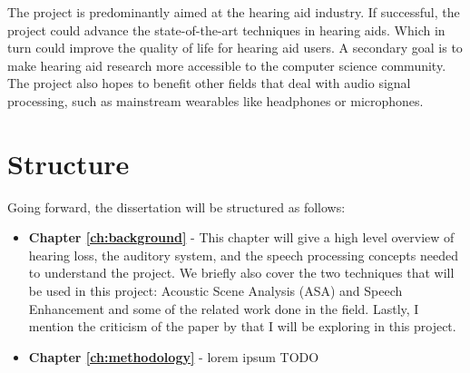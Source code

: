 \documentclass[logo,bsc,singlespacing,parskip,online]{infthesis}
\begin{document}
The project is predominantly aimed at the hearing aid industry. If successful, the project
could advance the state-of-the-art techniques in hearing aids.
Which in turn could improve the quality of life for hearing aid users.
A secondary goal is to make hearing aid research more accessible to the 
computer science community.
The project also hopes to benefit other fields that deal with audio signal processing,
such as mainstream wearables like headphones or microphones.


\section{Structure}
Going forward, the dissertation will be structured as follows:
\begin{itemize}  
   \item \textbf{Chapter \ref{ch:background}} - This chapter will give a high level overview of hearing loss, the auditory system, and the speech processing concepts needed to understand the project.
   We briefly also cover the two techniques that will be used in this project: Acoustic Scene Analysis (ASA) and Speech Enhancement
   and some of the related work done in the field. Lastly, I mention the criticism of the paper by \citet{Huwel2020HearDS} 
   that I will be exploring in this project.
   \item \textbf{Chapter \ref{ch:methodology}} - lorem ipsum
   TODO
\end{itemize}
 
\end{document}
